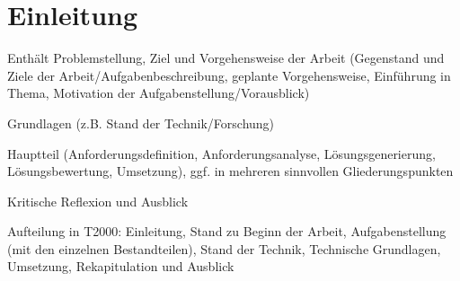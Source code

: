 
\chapter{Einleitung}
Enthält Problemstellung, Ziel und Vorgehensweise der Arbeit (Gegenstand und Ziele der Arbeit/Aufgabenbeschreibung,
geplante Vorgehensweise, Einführung in Thema, Motivation der Aufgabenstellung/Vorausblick)

Grundlagen (z.B. Stand der Technik/Forschung)

Hauptteil (Anforderungsdefinition, Anforderungsanalyse, Lösungsgenerierung, Lösungsbewertung, Umsetzung),
ggf. in mehreren sinnvollen Gliederungspunkten

Kritische Reflexion und Ausblick

Aufteilung in T2000: Einleitung, Stand zu Beginn der Arbeit, Aufgabenstellung (mit den einzelnen Bestandteilen), Stand der Technik, Technische Grundlagen, Umsetzung, Rekapitulation und Ausblick

